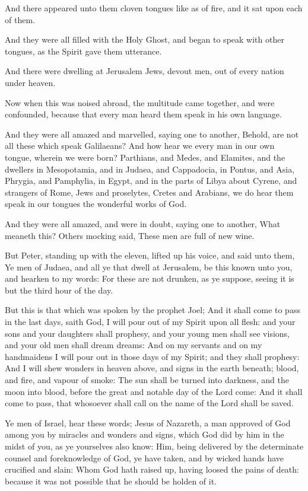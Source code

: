 \verse And there appeared unto them cloven tongues like as of fire, and it sat upon each of them.

\verse And they were all filled with the Holy Ghost, and began to speak with other tongues, as the Spirit gave them utterance.

\verse And there were dwelling at Jerusalem Jews, devout men, out of every nation under heaven.

\verse Now when this was noised abroad, the multitude came together, and were confounded, because that every man heard them speak in his own language.

\verse And they were all amazed and marvelled, saying one to another, Behold, are not all these which speak Galilaeans?  \verse And how hear we every man in our own tongue, wherein we were born?  \verse Parthians, and Medes, and Elamites, and the dwellers in Mesopotamia, and in Judaea, and Cappadocia, in Pontus, and Asia, \verse Phrygia, and Pamphylia, in Egypt, and in the parts of Libya about Cyrene, and strangers of Rome, Jews and proselytes, \verse Cretes and Arabians, we do hear them speak in our tongues the wonderful works of God.

\verse And they were all amazed, and were in doubt, saying one to another, What meaneth this?  \verse Others mocking said, These men are full of new wine.

\verse But Peter, standing up with the eleven, lifted up his voice, and said unto them, Ye men of Judaea, and all ye that dwell at Jerusalem, be this known unto you, and hearken to my words: \verse For these are not drunken, as ye suppose, seeing it is but the third hour of the day.

\verse But this is that which was spoken by the prophet Joel; \verse And it shall come to pass in the last days, saith God, I will pour out of my Spirit upon all flesh: and your sons and your daughters shall prophesy, and your young men shall see visions, and your old men shall dream dreams: \verse And on my servants and on my handmaidens I will pour out in those days of my Spirit; and they shall prophesy: \verse And I will shew wonders in heaven above, and signs in the earth beneath; blood, and fire, and vapour of smoke: \verse The sun shall be turned into darkness, and the moon into blood, before the great and notable day of the Lord come: \verse And it shall come to pass, that whosoever shall call on the name of the Lord shall be saved.

\verse Ye men of Israel, hear these words; Jesus of Nazareth, a man approved of God among you by miracles and wonders and signs, which God did by him in the midst of you, as ye yourselves also know: \verse Him, being delivered by the determinate counsel and foreknowledge of God, ye have taken, and by wicked hands have crucified and slain: \verse Whom God hath raised up, having loosed the pains of death: because it was not possible that he should be holden of it.

